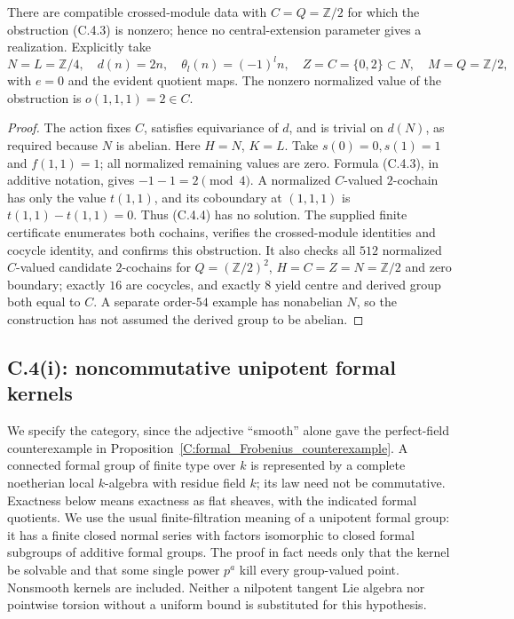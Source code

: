 \begin{proposition}
\label{C:baseline-free-obstruction-example}
There are compatible crossed-module data with $C=Q=\mathbb Z/2$
for which the obstruction (C.4.3) is nonzero; hence no central-extension
parameter gives a realization.  Explicitly take
\[
 N=L=\mathbb Z/4,\quad d(n)=2n,\quad
 \theta_l(n)=(-1)^l n,\quad Z=C=\{0,2\}\subset N,
 \quad M=Q=\mathbb Z/2,
\]
with $e=0$ and the evident quotient maps.  The nonzero normalized value
of the obstruction is $o(1,1,1)=2\in C$.
\end{proposition}
\begin{proof}
The action fixes $C$, satisfies equivariance of $d$, and is trivial on
$d(N)$, as required because $N$ is abelian.  Here $H=N$, $K=L$.
Take $s(0)=0,s(1)=1$ and $f(1,1)=1$; all normalized remaining values
are zero.  Formula (C.4.3), in additive notation, gives
$-1-1=2\pmod4$.  A normalized $C$-valued $2$-cochain has only the
value $t(1,1)$, and its coboundary at $(1,1,1)$ is
$t(1,1)-t(1,1)=0$.  Thus (C.4.4) has no solution.  The supplied
finite certificate enumerates both cochains, verifies the crossed-module
identities and cocycle identity, and confirms this obstruction.
It also checks all $512$ normalized $C$-valued candidate $2$-cochains
for $Q=(\mathbb Z/2)^2$, $H=C=Z=N=\mathbb Z/2$ and zero boundary;
exactly $16$ are cocycles, and exactly $8$ yield centre and derived group
both equal to $C$.  A separate order-$54$ example has nonabelian $N$,
so the construction has not assumed the derived group to be abelian.
\end{proof}

\subsection{C.4(i): noncommutative unipotent formal kernels}

We specify the category, since the adjective ``smooth'' alone gave the
perfect-field counterexample in Proposition~\ref{C:formal_Frobenius_counterexample}.
A connected formal group of finite type over $k$ is represented by a
complete noetherian local $k$-algebra with residue field $k$; its law need
not be commutative.  Exactness below means exactness as flat sheaves,
with the indicated formal quotients.  We use the usual finite-filtration
meaning of a unipotent formal group: it has a finite closed normal
series with factors isomorphic to closed formal subgroups of additive
formal groups.  The proof in fact needs only that the kernel be
solvable and that some single power $p^a$ kill every group-valued point.
Nonsmooth kernels are included.  Neither a
nilpotent tangent Lie algebra nor pointwise torsion without a uniform
bound is substituted for this hypothesis.

